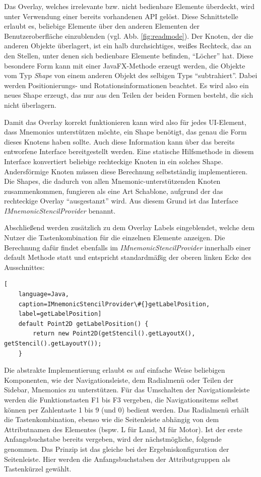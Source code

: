 Das Overlay, welches irrelevante bzw. nicht bedienbare Elemente überdeckt, wird unter Verwendung einer bereits vorhandenen API gelöst. Diese Schnittstelle erlaubt es, beliebige Elemente über den anderen Elementen der Benutzeroberfläche einzublenden (vgl. Abb. \ref{fig:readmode}). Der Knoten, der die anderen Objekte überlagert, ist ein halb durchsichtiges, weißes Rechteck, das an den Stellen, unter denen sich bedienbare Elemente befinden, \enquote{Löcher} hat. Diese besondere Form kann mit einer JavaFX-Methode erzeugt werden, die Objekte vom Typ \textit{Shape} von einem anderen Objekt des selbigen Typs \enquote{subtrahiert}. Dabei werden Positionierungs- und Rotationsinformationen beachtet. Es wird also ein neues Shape erzeugt, das nur aus den Teilen der beiden Formen besteht, die sich nicht überlagern.\par
Damit das Overlay korrekt funktionieren kann wird also für jedes UI-Element, dass Mnemonics unterstützen möchte, ein Shape benötigt, das genau die Form dieses Knotens haben sollte. Auch diese Information kann über das bereits entworfene Interface bereitgestellt werden. Eine statische Hilfsmethode in diesem Interface konvertiert beliebige rechteckige Knoten in ein solches Shape. Andersförmige Knoten müssen diese Berechnung selbstständig implementieren. Die Shapes, die dadurch von allen Mnemonic-unterstützenden Knoten zusammenkommen, fungieren als eine Art Schablone, aufgrund der das rechteckige Overlay \enquote{ausgestanzt} wird. Aus diesem Grund ist das Interface \textit{IMnemonicStencilProvider} benannt.\par
Abschließend werden zusätzlich zu dem Overlay Labels eingeblendet, welche dem Nutzer die Tastenkombination für die einzelnen Elemente anzeigen. Die Berechnung dafür findet ebenfalls im \textit{IMnemonicStencilProvider} innerhalb einer default Methode statt und entspricht standardmäßig der oberen linken Ecke des Ausschnittes:\par
{}
\begin{lstlisting}[
    language=Java,
    caption=IMnemonicStencilProvider\#{}getLabelPosition,
    label=getLabelPosition]
    default Point2D getLabelPosition() {
        return new Point2D(getStencil().getLayoutX(), getStencil().getLayoutY());
    }
\end{lstlisting}
Die abstrakte Implementierung erlaubt es auf einfache Weise beliebigen Komponenten, wie der Navigationsleiste, dem Radialmenü oder Teilen der Sidebar, Mnemonics zu unterstützen. Für das Umschalten der Navigationsleiste werden die Funktionstasten F1 bis F3 vergeben, die Navigationsitems selbst können per Zahlentaste 1 bis 9 (und 0) bedient werden. Das Radialmenü erhält die Tastenkombination, ebenso wie die Seitenleiste abhängig von dem Attributnamen des Elementes (bspw. L für Land, M für Motor). Ist der erste Anfangsbuchstabe bereits vergeben, wird der nächstmögliche, folgende genommen. Das Prinzip ist das gleiche bei der Ergebniskonfiguration der Seitenleiste. Hier werden die Anfangsbuchstaben der Attributgruppen als Tastenkürzel gewählt.\par
